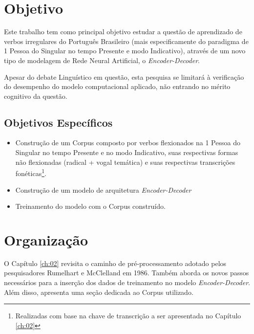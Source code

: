 \section{Objetivo}
\label{sec:objectives}

Este trabalho tem como principal objetivo estudar a questão de aprendizado de verbos irregulares do Português Brasileiro (mais especificamente do paradigma de 1 Pessoa do Singular no tempo Presente e modo Indicativo), através de um novo tipo de modelagem de Rede Neural Artificial, o \textit{Encoder-Decoder}. 

Apesar do debate Linguístico em questão, esta pesquisa se limitará à verificação do desempenho do modelo computacional aplicado, não entrando no mérito cognitivo da questão.


\subsection{Objetivos Específicos}

\begin{itemize}
    \item Construção de um Corpus composto por verbos flexionados na 1 Pessoa do Singular no tempo Presente e no modo Indicativo, suas respectivas formas não flexionadas (radical + vogal temática) e suas respectivas transcrições fonéticas\footnote{Realizadas com base na chave de transcrição a ser apresentada no Capítulo \ref{ch:02}}.
    \item Construção de um modelo de arquitetura \textit{Encoder-Decoder}
    \item Treinamento do modelo com o Corpus construído.
\end{itemize}



\section{Organização}
\label{sec:organization}

O Capítulo \ref{ch:02} revisita o caminho de pré-processamento adotado pelos pesquisadores Rumelhart e McClelland em 1986. Também aborda os novos passos necessários para a inserção dos dados de treinamento no modelo \textit{Encoder-Decoder}. Além disso, apresenta uma seção dedicada ao Corpus utilizado.

